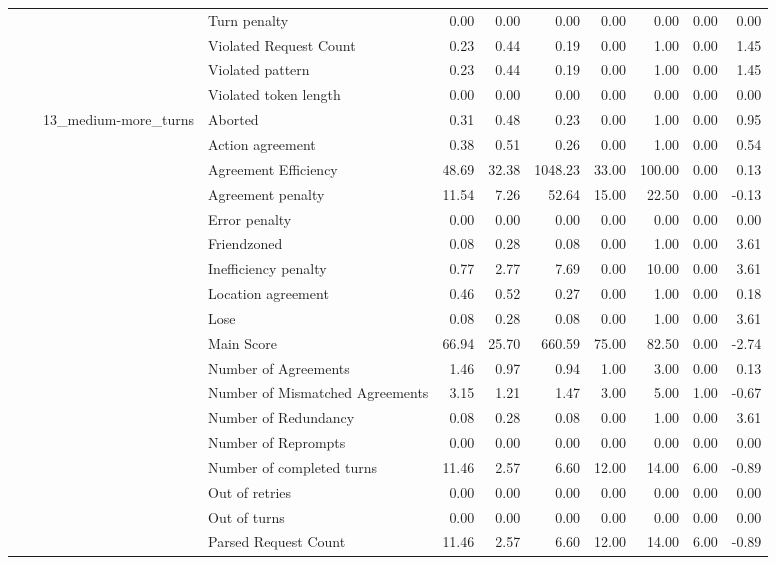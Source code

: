 \begin{tabular}{llllrrrrrrr}
 &  &  & Turn penalty & 0.00 & 0.00 & 0.00 & 0.00 & 0.00 & 0.00 & 0.00 \\
 &  &  & Violated Request Count & 0.23 & 0.44 & 0.19 & 0.00 & 1.00 & 0.00 & 1.45 \\
 &  &  & Violated pattern & 0.23 & 0.44 & 0.19 & 0.00 & 1.00 & 0.00 & 1.45 \\
 &  &  & Violated token length & 0.00 & 0.00 & 0.00 & 0.00 & 0.00 & 0.00 & 0.00 \\
\cline{3-11}
 &  & \multirow[t]{27}{*}{13_medium-more_turns} & Aborted & 0.31 & 0.48 & 0.23 & 0.00 & 1.00 & 0.00 & 0.95 \\
 &  &  & Action agreement & 0.38 & 0.51 & 0.26 & 0.00 & 1.00 & 0.00 & 0.54 \\
 &  &  & Agreement Efficiency & 48.69 & 32.38 & 1048.23 & 33.00 & 100.00 & 0.00 & 0.13 \\
 &  &  & Agreement penalty & 11.54 & 7.26 & 52.64 & 15.00 & 22.50 & 0.00 & -0.13 \\
 &  &  & Error penalty & 0.00 & 0.00 & 0.00 & 0.00 & 0.00 & 0.00 & 0.00 \\
 &  &  & Friendzoned & 0.08 & 0.28 & 0.08 & 0.00 & 1.00 & 0.00 & 3.61 \\
 &  &  & Inefficiency penalty & 0.77 & 2.77 & 7.69 & 0.00 & 10.00 & 0.00 & 3.61 \\
 &  &  & Location agreement & 0.46 & 0.52 & 0.27 & 0.00 & 1.00 & 0.00 & 0.18 \\
 &  &  & Lose & 0.08 & 0.28 & 0.08 & 0.00 & 1.00 & 0.00 & 3.61 \\
 &  &  & Main Score & 66.94 & 25.70 & 660.59 & 75.00 & 82.50 & 0.00 & -2.74 \\
 &  &  & Number of Agreements & 1.46 & 0.97 & 0.94 & 1.00 & 3.00 & 0.00 & 0.13 \\
 &  &  & Number of Mismatched Agreements & 3.15 & 1.21 & 1.47 & 3.00 & 5.00 & 1.00 & -0.67 \\
 &  &  & Number of Redundancy & 0.08 & 0.28 & 0.08 & 0.00 & 1.00 & 0.00 & 3.61 \\
 &  &  & Number of Reprompts & 0.00 & 0.00 & 0.00 & 0.00 & 0.00 & 0.00 & 0.00 \\
 &  &  & Number of completed turns & 11.46 & 2.57 & 6.60 & 12.00 & 14.00 & 6.00 & -0.89 \\
 &  &  & Out of retries & 0.00 & 0.00 & 0.00 & 0.00 & 0.00 & 0.00 & 0.00 \\
 &  &  & Out of turns & 0.00 & 0.00 & 0.00 & 0.00 & 0.00 & 0.00 & 0.00 \\
 &  &  & Parsed Request Count & 11.46 & 2.57 & 6.60 & 12.00 & 14.00 & 6.00 & -0.89 \\

\end{tabular}
